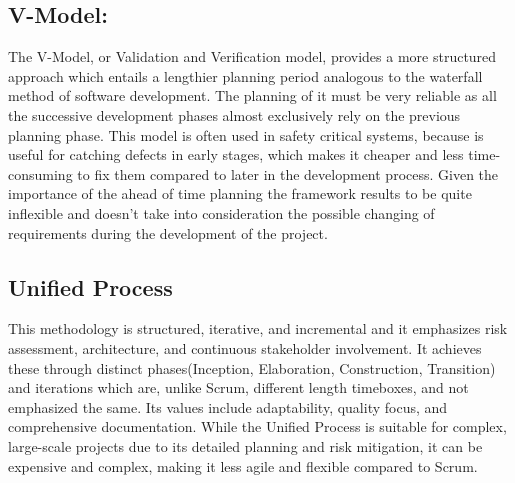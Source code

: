 \subsection*{V-Model:} 
The V-Model, or Validation and Verification model, provides a more structured approach which entails a lengthier planning period analogous to the waterfall method of software development. The planning of it must be very reliable as all the successive development phases almost exclusively rely on the previous planning phase. This model is often used in safety critical systems, because is useful for catching defects in early stages, which makes it cheaper and less time-consuming to fix them compared to later in the development process. Given the importance of the ahead of time planning the framework results to be quite inflexible and doesn't take into consideration the possible changing of requirements during the development of the project.

\subsection*{Unified Process}
This methodology is structured, iterative, and incremental and it emphasizes risk assessment, architecture, and continuous stakeholder involvement. It achieves these through distinct phases(Inception, Elaboration, Construction, Transition) and iterations which are, unlike Scrum, different length timeboxes, and not emphasized the same. Its values include adaptability, quality focus, and comprehensive documentation. While the Unified Process is suitable for complex, large-scale projects due to its detailed planning and risk mitigation, it can be expensive and complex, making it less agile and flexible compared to Scrum.

